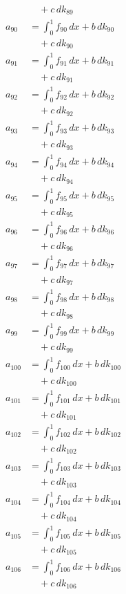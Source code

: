 \documentclass{article}
\begin{document}
\begin{align}
&\quad + c\,dk_{89} \\
a_{90} &= \int_0^1 f_{90}\,dx + b\,dk_{90} \\
&\quad + c\,dk_{90} \\
a_{91} &= \int_0^1 f_{91}\,dx + b\,dk_{91} \\
&\quad + c\,dk_{91} \\
a_{92} &= \int_0^1 f_{92}\,dx + b\,dk_{92} \\
&\quad + c\,dk_{92} \\
a_{93} &= \int_0^1 f_{93}\,dx + b\,dk_{93} \\
&\quad + c\,dk_{93} \\
a_{94} &= \int_0^1 f_{94}\,dx + b\,dk_{94} \\
&\quad + c\,dk_{94} \\
a_{95} &= \int_0^1 f_{95}\,dx + b\,dk_{95} \\
&\quad + c\,dk_{95} \\
a_{96} &= \int_0^1 f_{96}\,dx + b\,dk_{96} \\
&\quad + c\,dk_{96} \\
a_{97} &= \int_0^1 f_{97}\,dx + b\,dk_{97} \\
&\quad + c\,dk_{97} \\
a_{98} &= \int_0^1 f_{98}\,dx + b\,dk_{98} \\
&\quad + c\,dk_{98} \\
a_{99} &= \int_0^1 f_{99}\,dx + b\,dk_{99} \\
&\quad + c\,dk_{99} \\
a_{100} &= \int_0^1 f_{100}\,dx + b\,dk_{100} \\
&\quad + c\,dk_{100} \\
a_{101} &= \int_0^1 f_{101}\,dx + b\,dk_{101} \\
&\quad + c\,dk_{101} \\
a_{102} &= \int_0^1 f_{102}\,dx + b\,dk_{102} \\
&\quad + c\,dk_{102} \\
a_{103} &= \int_0^1 f_{103}\,dx + b\,dk_{103} \\
&\quad + c\,dk_{103} \\
a_{104} &= \int_0^1 f_{104}\,dx + b\,dk_{104} \\
&\quad + c\,dk_{104} \\
a_{105} &= \int_0^1 f_{105}\,dx + b\,dk_{105} \\
&\quad + c\,dk_{105} \\
a_{106} &= \int_0^1 f_{106}\,dx + b\,dk_{106} \\
&\quad + c\,dk_{106} \\

\end{align}
\end{document}
